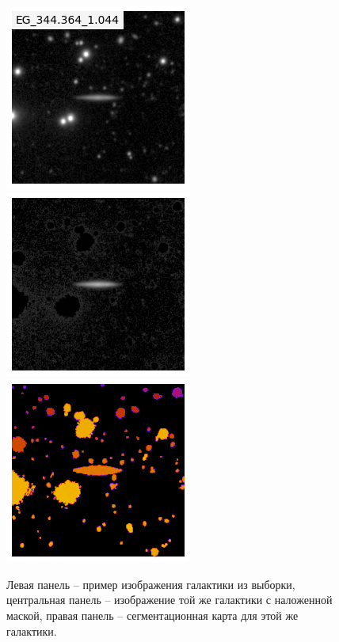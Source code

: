 \begin{figure}[ht]

    \includegraphics[width=.33\textwidth]{images/data_no_mask.png}\hfill
    \includegraphics[width=.33\textwidth]{images/data_with_mask.png}\hfill
    \includegraphics[width=.33\textwidth]{images/segm.png}\hfill

    \caption{Левая панель -- пример изображения галактики из выборки, центральная панель -- изображение той же галактики с наложенной маской, правая панель -- сегментационная карта для этой же галактики. }\label{fig:mask}
\end{figure}
